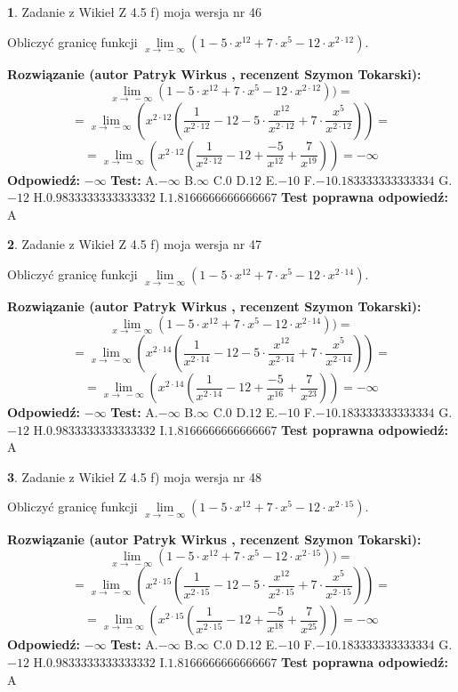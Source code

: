 \documentclass[12pt, a4paper]{article}
\theoremstyle{definition} %
\newtheorem{zad}{}
\newcommand{\zadStart}[1]{\begin{zad}#1\newline}
\newcommand{\zadStop}{\end{zad}}
\newcommand{\rozwStart}[2]{\noindent \textbf{Rozwiązanie (autor #1 , recenzent #2): }\newline}
\newcommand{\rozwStop}{\newline}
\newcommand{\odpStart}{\noindent \textbf{Odpowiedź:}\newline}
\newcommand{\odpStop}{\newline}
\newcommand{\testStart}{\noindent \textbf{Test:}\newline}
\newcommand{\testStop}{\newline}
\newcommand{\kluczStart}{\noindent \textbf{Test poprawna odpowiedź:}\newline}
\newcommand{\kluczStop}{\newline}
\begin{document}
\zadStart{Zadanie z Wikieł Z 4.5 f) moja wersja nr 46}


Obliczyć granicę funkcji  $\lim\limits_{x\to\ -\infty}(1 - 5 \cdot x^{12}+7 \cdot x^{5}- 12 \cdot x^{2\cdot12})$.
\zadStop
\rozwStart{Patryk Wirkus}{Szymon Tokarski}
$$\lim\limits_{x\to\ -\infty}(1 - 5 \cdot x^{12}+7 \cdot x^{5}- 12 \cdot x^{2\cdot12}))=$$
$$=\lim\limits_{x\to\ -\infty}(x^{2\cdot12}(\frac{1}{x^{2\cdot12}}-12 -5 \cdot \frac{x^{12}}{x^{2\cdot12}}+7 \cdot \frac{x^{5}}{x^{2\cdot12}}))=$$
$$=\lim\limits_{x\to\ -\infty}(x^{2\cdot12}(\frac{1}{x^{2\cdot12}}-12 + \frac{-5}{x^{12}}+ \frac{7}{x^{19}}))=-\infty$$
\rozwStop
\odpStart
$-\infty$
\odpStop
\testStart
A.$-\infty$ B.$\infty$ C.$0$ D.$12$ E.$-10$
F.$-10.183333333333334$ G.$-12$
H.$0.9833333333333332$
I.$1.8166666666666667$
\testStop
\kluczStart
A
\kluczStop



\zadStart{Zadanie z Wikieł Z 4.5 f) moja wersja nr 47}


Obliczyć granicę funkcji  $\lim\limits_{x\to\ -\infty}(1 - 5 \cdot x^{12}+7 \cdot x^{5}- 12 \cdot x^{2\cdot14})$.
\zadStop
\rozwStart{Patryk Wirkus}{Szymon Tokarski}
$$\lim\limits_{x\to\ -\infty}(1 - 5 \cdot x^{12}+7 \cdot x^{5}- 12 \cdot x^{2\cdot14}))=$$
$$=\lim\limits_{x\to\ -\infty}(x^{2\cdot14}(\frac{1}{x^{2\cdot14}}-12 -5 \cdot \frac{x^{12}}{x^{2\cdot14}}+7 \cdot \frac{x^{5}}{x^{2\cdot14}}))=$$
$$=\lim\limits_{x\to\ -\infty}(x^{2\cdot14}(\frac{1}{x^{2\cdot14}}-12 + \frac{-5}{x^{16}}+ \frac{7}{x^{23}}))=-\infty$$
\rozwStop
\odpStart
$-\infty$
\odpStop
\testStart
A.$-\infty$ B.$\infty$ C.$0$ D.$12$ E.$-10$
F.$-10.183333333333334$ G.$-12$
H.$0.9833333333333332$
I.$1.8166666666666667$
\testStop
\kluczStart
A
\kluczStop



\zadStart{Zadanie z Wikieł Z 4.5 f) moja wersja nr 48}


Obliczyć granicę funkcji  $\lim\limits_{x\to\ -\infty}(1 - 5 \cdot x^{12}+7 \cdot x^{5}- 12 \cdot x^{2\cdot15})$.
\zadStop
\rozwStart{Patryk Wirkus}{Szymon Tokarski}
$$\lim\limits_{x\to\ -\infty}(1 - 5 \cdot x^{12}+7 \cdot x^{5}- 12 \cdot x^{2\cdot15}))=$$
$$=\lim\limits_{x\to\ -\infty}(x^{2\cdot15}(\frac{1}{x^{2\cdot15}}-12 -5 \cdot \frac{x^{12}}{x^{2\cdot15}}+7 \cdot \frac{x^{5}}{x^{2\cdot15}}))=$$
$$=\lim\limits_{x\to\ -\infty}(x^{2\cdot15}(\frac{1}{x^{2\cdot15}}-12 + \frac{-5}{x^{18}}+ \frac{7}{x^{25}}))=-\infty$$
\rozwStop
\odpStart
$-\infty$
\odpStop
\testStart
A.$-\infty$ B.$\infty$ C.$0$ D.$12$ E.$-10$
F.$-10.183333333333334$ G.$-12$
H.$0.9833333333333332$
I.$1.8166666666666667$
\testStop
\kluczStart
A
\kluczStop
\end{document}
